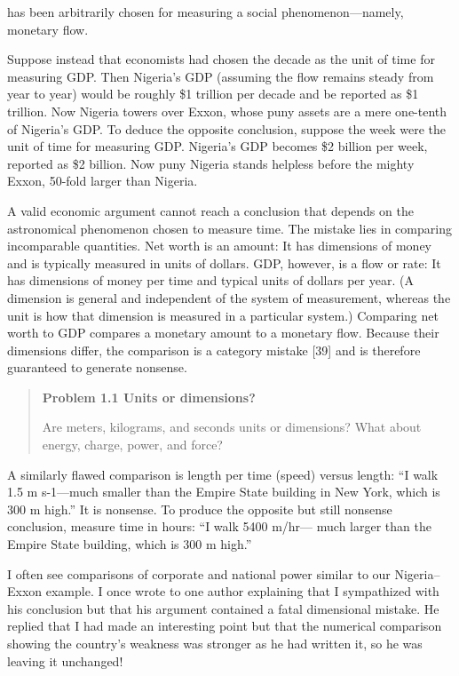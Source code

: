 \documentclass[12pt]{article}
\begin{document}
has been arbitrarily chosen for measuring a social phenomenon—namely,
monetary flow.

Suppose instead that economists had chosen the decade as the unit of
time for measuring GDP. Then Nigeria’s GDP (assuming the flow remains
steady from year to year) would be roughly \$1 trillion per decade and
be reported as \$1 trillion. Now Nigeria towers over Exxon, whose puny
assets are a mere one-tenth of Nigeria’s GDP. To deduce the opposite
conclusion, suppose the week were the unit of time for measuring GDP.
Nigeria’s GDP becomes \$2 billion per week, reported as \$2 billion. Now
puny Nigeria stands helpless before the mighty Exxon, 50-fold larger than
Nigeria.

A valid economic argument cannot reach a conclusion that depends on
the astronomical phenomenon chosen to measure time. The mistake lies
in comparing incomparable quantities. Net worth is an amount: It has
dimensions of money and is typically measured in units of dollars. GDP,
however, is a flow or rate: It has dimensions of money per time and
typical units of dollars per year. (A dimension is general and independent
of the system of measurement, whereas the unit is how that dimension is
measured in a particular system.) Comparing net worth to GDP compares
a monetary amount to a monetary flow. Because their dimensions differ,
the comparison is a category mistake [39] and is therefore guaranteed to
generate nonsense.

\begin{quote}
\textbf{Problem 1.1 Units or dimensions?} 

Are meters, kilograms, and seconds units or dimensions? What about energy,
charge, power, and force?
\end{quote}


A similarly flawed comparison is length per time (speed) versus length:
“I walk 1.5 m s-1—much smaller than the Empire State building in New
York, which is 300 m high.” It is nonsense. To produce the opposite but
still nonsense conclusion, measure time in hours: “I walk 5400 m/hr—
much larger than the Empire State building, which is 300 m high.”

I often see comparisons of corporate and national power similar to our
Nigeria–Exxon example. I once wrote to one author explaining that I
sympathized with his conclusion but that his argument contained a fatal
dimensional mistake. He replied that I had made an interesting point
but that the numerical comparison showing the country’s weakness was
stronger as he had written it, so he was leaving it unchanged!
\newpage
\pagestyle{fancy} 
\renewcommand{\headrulewidth}{0pt} 
\fancyhf{}
\end{document}

